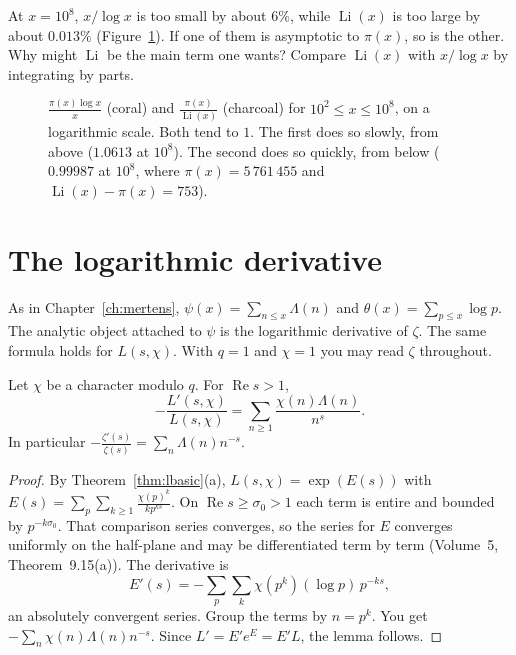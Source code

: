 \begin{think}
At $x=10^8$, $x/\log x$ is too small by about $6\%$, while $\operatorname{Li}(x)$ is too large by about $0.013\%$ (Figure~\ref{fig:pnt}). If one of them is asymptotic to $\pi(x)$, so is the other. Why might $\operatorname{Li}$ be the main term one wants? Compare $\operatorname{Li}(x)$ with $x/\log x$ by integrating by parts.
\end{think}

\begin{figure}[ht]
\centering
{}
\caption{$\frac{\pi(x)\log x}x$ (coral) and $\frac{\pi(x)}{\operatorname{Li}(x)}$ (charcoal) for $10^2\le x\le10^8$, on a logarithmic scale. Both tend to $1$. The first does so slowly, from above ($1.0613$ at $10^8$). The second does so quickly, from below ($0.99987$ at $10^8$, where $\pi(x)=5\,761\,455$ and $\operatorname{Li}(x)-\pi(x)=753$).}
\label{fig:pnt}
\end{figure}

\section{The logarithmic derivative}

As in Chapter~\ref{ch:mertens}, $\psi(x)=\sum_{n\le x}\Lambda(n)$ and $\theta(x)=\sum_{p\le x}\log p$. The analytic object attached to $\psi$ is the logarithmic derivative of $\zeta$. The same formula holds for $L(s,\chi)$. With $q=1$ and $\chi=1$ you may read $\zeta$ throughout.

\begin{lemma}\label{lem:logderiv}
Let $\chi$ be a character modulo $q$. For $\operatorname{Re}s>1$,
\[
-\frac{L'(s,\chi)}{L(s,\chi)}=\sum_{n\ge1}\frac{\chi(n)\Lambda(n)}{n^s}.
\]
In particular $-\frac{\zeta'(s)}{\zeta(s)}=\sum_n\Lambda(n)n^{-s}$.
\end{lemma}
\begin{proof}
By Theorem~\ref{thm:lbasic}(a), $L(s,\chi)=\exp(E(s))$ with $E(s)=\sum_p\sum_{k\ge1}\frac{\chi(p)^k}{kp^{ks}}$. On $\operatorname{Re}s\ge\sigma_0>1$ each term is entire and bounded by $p^{-k\sigma_0}$. That comparison series converges, so the series for $E$ converges uniformly on the half-plane and may be differentiated term by term (Volume~5, Theorem~9.15(a)). The derivative is
\[
E'(s)=-\sum_p\sum_k\chi(p^k)(\log p)\,p^{-ks},
\]
an absolutely convergent series. Group the terms by $n=p^k$. You get $-\sum_n\chi(n)\Lambda(n)n^{-s}$. Since $L'=E'e^E=E'L$, the lemma follows.
\end{proof}

